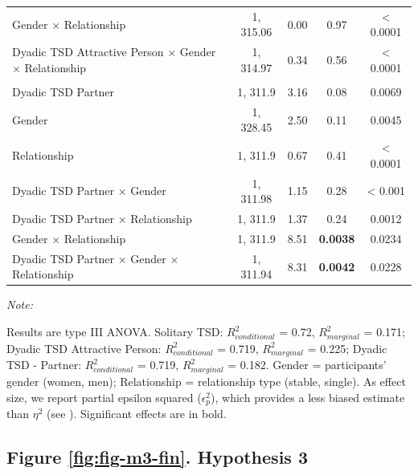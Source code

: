 \documentclass[
  bookmarksnumbered]{article}
\begin{document}
\begin{table}[H]
{\begin{threeparttable}
\begin{tabular}[t]{lcccc}
\hspace{1em}Gender × Relationship & 1, 315.06 & 0.00 & 0.97 & < 0.0001\\
\hspace{1em}Dyadic TSD Attractive Person × Gender × Relationship & 1, 314.97 & 0.34 & 0.56 & < 0.0001\\
\addlinespace[0.3em]
\multicolumn{5}{l}{\cellcolor{lightgray}{Dyadic TSD Partner}}\\
\hspace{1em}Dyadic TSD Partner & 1, 311.9 & 3.16 & 0.08 & 0.0069\\
\hspace{1em}Gender & 1, 328.45 & 2.50 & 0.11 & 0.0045\\
\hspace{1em}Relationship & 1, 311.9 & 0.67 & 0.41 & < 0.0001\\
\hspace{1em}Dyadic TSD Partner × Gender & 1, 311.98 & 1.15 & 0.28 & < 0.001\\
\hspace{1em}Dyadic TSD Partner × Relationship & 1, 311.9 & 1.37 & 0.24 & 0.0012\\
\hspace{1em}Gender × Relationship & 1, 311.9 & 8.51 & \textbf{0.0038} & 0.0234\\
\hspace{1em}Dyadic TSD Partner × Gender × Relationship & 1, 311.94 & 8.31 & \textbf{0.0042} & 0.0228\\
\bottomrule
\end{tabular}
\begin{tablenotes}[para]
\item \textit{Note: } 
\item Results are type III ANOVA. Solitary TSD: $R^2_{conditional}$ = 0.72, $R^2_{marginal}$ = 0.171; Dyadic TSD Attractive Person: $R^2_{conditional}$ = 0.719, $R^2_{marginal}$ = 0.225; Dyadic TSD - Partner: $R^2_{conditional}$ = 0.719, $R^2_{marginal}$ = 0.182. Gender = participants' gender (women, men); Relationship = relationship type
      (stable, single). As effect size, we report partial epsilon squared ($\epsilon^2_p$),
      which provides a less biased estimate than $\eta^2$ 
      (see \cite{albersWhenPowerAnalyses2018}). Significant effects are in bold.
\end{tablenotes}
\end{threeparttable}}
\end{table}

\subsection{Figure \ref{fig:fig-m3-fin}. Hypothesis 3}\label{figure-reffigfig-m3-fin.-hypothesis-3}
\end{document}

